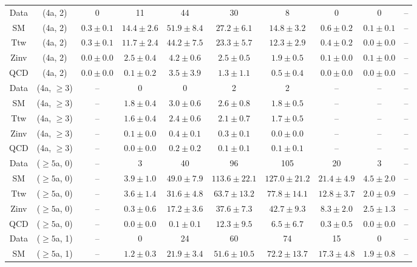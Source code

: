 \begin{table}[h!]
{\begin{tabular}{cccccccccc}
	Data & (4a, 2) & 0 & 11 & 44 & 30 & 8 & 0 & 0 & -- \\[0.5ex] 
	SM & (4a, 2) & $0.3\pm 0.1$ & $14.4\pm 2.6$ & $51.9\pm 8.4$ & $27.2\pm 6.1$ & $14.8\pm 3.2$ & $0.6\pm 0.2$ & $0.1\pm 0.1$ & -- \\[0.5ex] 
	Ttw & (4a, 2) & $0.3\pm 0.1$ & $11.7\pm 2.4$ & $44.2\pm 7.5$ & $23.3\pm 5.7$ & $12.3\pm 2.9$ & $0.4\pm 0.2$ & $0.0\pm 0.0$ & -- \\[0.5ex] 
	Zinv & (4a, 2) & $0.0\pm 0.0$ & $2.5\pm 0.4$ & $4.2\pm 0.6$ & $2.5\pm 0.5$ & $1.9\pm 0.5$ & $0.1\pm 0.0$ & $0.1\pm 0.0$ & -- \\[0.5ex] 
	QCD & (4a, 2) & $0.0\pm 0.0$ & $0.1\pm 0.2$ & $3.5\pm 3.9$ & $1.3\pm 1.1$ & $0.5\pm 0.4$ & $0.0\pm 0.0$ & $0.0\pm 0.0$ & -- \\[0.5ex] 
	Data & (4a, $\ge3$) & -- & 0 & 0 & 2 & 2 & -- & -- & -- \\[0.5ex] 
	SM & (4a, $\ge3$) & -- & $1.8\pm 0.4$ & $3.0\pm 0.6$ & $2.6\pm 0.8$ & $1.8\pm 0.5$ & -- & -- & -- \\[0.5ex] 
	Ttw & (4a, $\ge3$) & -- & $1.6\pm 0.4$ & $2.4\pm 0.6$ & $2.1\pm 0.7$ & $1.7\pm 0.5$ & -- & -- & -- \\[0.5ex] 
	Zinv & (4a, $\ge3$) & -- & $0.1\pm 0.0$ & $0.4\pm 0.1$ & $0.3\pm 0.1$ & $0.0\pm 0.0$ & -- & -- & -- \\[0.5ex] 
	QCD & (4a, $\ge3$) & -- & $0.0\pm 0.0$ & $0.2\pm 0.2$ & $0.1\pm 0.1$ & $0.1\pm 0.1$ & -- & -- & -- \\[0.5ex] 
	Data & ($\ge5$a, 0) & -- & 3 & 40 & 96 & 105 & 20 & 3 & -- \\[0.5ex] 
	SM & ($\ge5$a, 0) & -- & $3.9\pm 1.0$ & $49.0\pm 7.9$ & $113.6\pm 22.1$ & $127.0\pm 21.2$ & $21.4\pm 4.9$ & $4.5\pm 2.0$ & -- \\[0.5ex] 
	Ttw & ($\ge5$a, 0) & -- & $3.6\pm 1.4$ & $31.6\pm 4.8$ & $63.7\pm 13.2$ & $77.8\pm 14.1$ & $12.8\pm 3.7$ & $2.0\pm 0.9$ & -- \\[0.5ex] 
	Zinv & ($\ge5$a, 0) & -- & $0.3\pm 0.6$ & $17.2\pm 3.6$ & $37.6\pm 7.3$ & $42.7\pm 9.3$ & $8.3\pm 2.0$ & $2.5\pm 1.3$ & -- \\[0.5ex] 
	QCD & ($\ge5$a, 0) & -- & $0.0\pm 0.0$ & $0.1\pm 0.1$ & $12.3\pm 9.5$ & $6.5\pm 6.7$ & $0.3\pm 0.5$ & $0.0\pm 0.0$ & -- \\[0.5ex] 
	Data & ($\ge5$a, 1) & -- & 0 & 24 & 60 & 74 & 15 & 0 & -- \\[0.5ex] 
	SM & ($\ge5$a, 1) & -- & $1.2\pm 0.3$ & $21.9\pm 3.4$ & $51.6\pm 10.5$ & $72.2\pm 13.7$ & $17.3\pm 4.8$ & $1.9\pm 0.8$ & -- \\[0.5ex] 

\end{tabular}}
\end{table}
